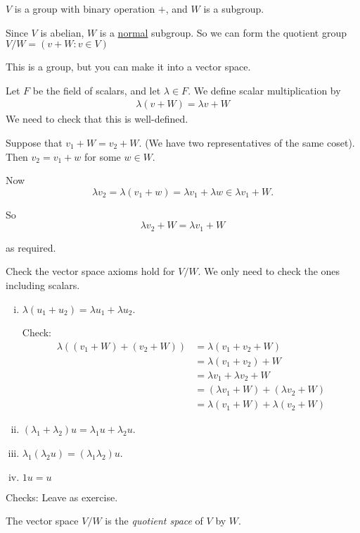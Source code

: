 \documentclass{article}
\theoremstyle{definition} \newtheorem*{definition}{Definition}
\begin{document}
  $V$ is a group with binary operation $+$, and $W$ is a subgroup.
 
  Since $V$ is abelian, $W$ is a \underline{normal} subgroup. So we can form the quotient group $V/W = \left( v+W : v \in V \right)$

  This is a group, but you can make it into a vector space.

  Let $F$ be the field of scalars, and let $\lambda \in F$. We define 
  scalar multiplication by
  \begin{align*}
    \lambda(v + W) = \lambda v + W
  \end{align*}
We need to check that this is well-defined.

Suppose that $v_1 + W = v_2 + W$. (We have two representatives of the same
coset). Then $v_2 = v_1 + w$ for some $w \in W$. 

Now \[
\lambda v_2 = \lambda (v_1 + w) = \lambda v_1 + \lambda w \in \lambda v_1
+ W.\]

So \[
  \lambda v_2 + W = \lambda v_1 + W
\]

as required.

Check the vector space axioms hold for $V/W$. We only need to check the ones including scalars.

\begin{enumerate}[(i)]
  \item 
    $\lambda (u_1 + u_2) = \lambda u_1 + \lambda u_2$.

    Check: 
    \begin{align*}
    \lambda \left( (v_1 + W) + (v_2 + W) \right) &= \lambda \left( v_1 +
    v_2 + W \right) \\
     &= \lambda (v_1 + v_2) + W \\ &= \lambda v_1 + \lambda v_2 + W\\
     &= (\lambda v_1 + W) + (\lambda v_2 + W) \\ &= \lambda(v_1 + W) + \lambda(v_2 + W)
    \end{align*}
  \item
$(\lambda_1 + \lambda_2)u = \lambda_1 u + \lambda_2 u$.
  \item
$\lambda_1 ( \lambda_2u) = (\lambda_1 \lambda_2) u$.
  \item 
$1u = u$
\end{enumerate}

Checks: Leave as exercise.

The vector space $V/W$ is the \emph{quotient space} of $V$ by $W$.\\
\end{document}
